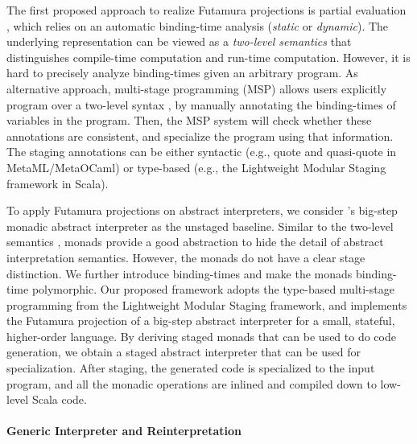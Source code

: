The first proposed approach to realize Futamura projections is partial
evaluation \cite{DBLP:books/daglib/0072559}, which relies on an automatic
binding-time analysis (\textit{static} or \textit{dynamic}).  The underlying
representation can be viewed as a \textit{two-level semantics}
\cite{NIELSON1989117, NIELSON198859} that distinguishes compile-time
computation and run-time computation.
However, it is hard to precisely analyze binding-times given an arbitrary
program. As alternative approach, multi-stage programming (MSP)
\cite{taha1999multi, DBLP:conf/pepm/TahaS97} allows users explicitly program over
a two-level syntax \cite{Nielson:1992:TFL:130665}, by manually
annotating the binding-times of variables in the program. Then, the MSP system
will check whether these annotations are consistent, and specialize the program
using that information. The staging annotations can be either syntactic (e.g.,
quote and quasi-quote in MetaML/MetaOCaml) or type-based (e.g., the Lightweight
Modular Staging framework \cite{DBLP:conf/gpce/RompfO10} in Scala).

To apply Futamura projections on abstract interpreters, we consider
\citet{DBLP:journals/pacmpl/DaraisLNH17}'s big-step monadic abstract
interpreter as the unstaged baseline.  Similar to the two-level semantics
\cite{NIELSON1989117}, monads provide a good abstraction to hide the detail of
abstract interpretation semantics. However, the monads do not have a clear
stage distinction.
We further introduce binding-times and make the monads binding-time polymorphic.
Our proposed framework adopts the type-based multi-stage programming from the
Lightweight Modular Staging framework, and implements the Futamura projection
of a big-step abstract interpreter for a small, stateful, higher-order
language. By deriving staged monads that can be used to do code generation, we
obtain a staged abstract interpreter that can be used for specialization. After
staging, the generated code is specialized to the input program, and all the
monadic operations are inlined and compiled down to low-level Scala code.



\paragraph{Generic Interpreter and Reinterpretation}

